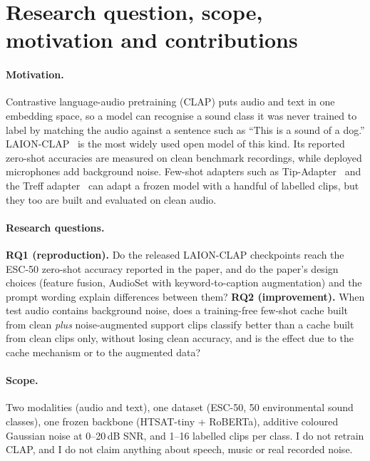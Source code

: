 \section{Research question, scope, motivation and contributions}
\label{sec:intro}

\paragraph{Motivation.}
Contrastive language-audio pretraining (CLAP) puts audio and text in one embedding space, so a model can recognise a sound class it was never trained to label by matching the audio against a sentence such as ``This is a sound of a dog.''
LAION-CLAP~\cite{wu2023laionclap} is the most widely used open model of this kind. Its reported zero-shot accuracies are measured on clean benchmark recordings, while deployed microphones add background noise.
Few-shot adapters such as Tip-Adapter~\cite{zhang2022tip} and the Treff adapter~\cite{liang2023treff} can adapt a frozen model with a handful of labelled clips, but they too are built and evaluated on clean audio.

\paragraph{Research questions.}
\textbf{RQ1 (reproduction).} Do the released LAION-CLAP checkpoints reach the ESC-50 zero-shot accuracy reported in the paper, and do the paper's design choices (feature fusion, AudioSet with keyword-to-caption augmentation) and the prompt wording explain differences between them?
\textbf{RQ2 (improvement).} When test audio contains background noise, does a training-free few-shot cache built from clean \emph{plus} noise-augmented support clips classify better than a cache built from clean clips only, without losing clean accuracy, and is the effect due to the cache mechanism or to the augmented data?

\paragraph{Scope.}
Two modalities (audio and text), one dataset (ESC-50, 50 environmental sound classes), one frozen backbone (HTSAT-tiny + RoBERTa), additive coloured Gaussian noise at 0--20\,dB SNR, and 1--16 labelled clips per class.
I do not retrain CLAP, and I do not claim anything about speech, music or real recorded noise.

